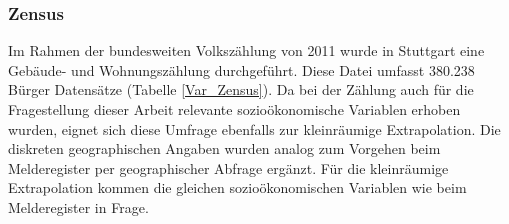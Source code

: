 \documentclass{Vorlage}
\begin{document}
\begin{table}[h]
\centering
\caption{Sozioökonomische und geographische Variablen des Melderegisters und deren Anzahl der Ausprägungen.}
\label{Var_Buergerumfrage}
\end{table}

\subsubsection{Zensus}
Im Rahmen der bundesweiten Volkszählung von 2011 wurde in Stuttgart eine Gebäude- und Wohnungszählung durchgeführt. Diese Datei umfasst 380.238 Bürger Datensätze (Tabelle \ref{Var_Zensus}). Da bei der Zählung auch für die Fragestellung dieser Arbeit relevante sozioökonomische Variablen 
erhoben wurden, eignet sich diese Umfrage ebenfalls zur kleinräumige Extrapolation. Die diskreten geographischen 
Angaben wurden analog zum Vorgehen beim Melderegister per geographischer Abfrage ergänzt. Für die kleinräumige Extrapolation kommen 
die gleichen sozioökonomischen Variablen wie beim Melderegister in Frage. 
\end{document}

